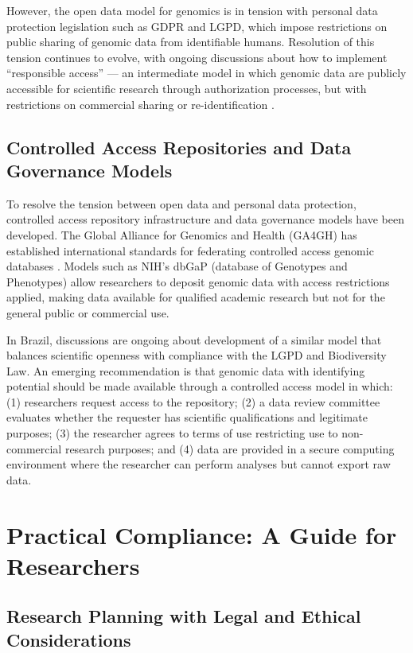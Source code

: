 However, the open data model for genomics is in tension with personal data protection legislation such as GDPR and LGPD, which impose restrictions on public sharing of genomic data from identifiable humans. Resolution of this tension continues to evolve, with ongoing discussions about how to implement ``responsible access'' --- an intermediate model in which genomic data are publicly accessible for scientific research through authorization processes, but with restrictions on commercial sharing or re-identification \parencite{ga4gh2018}.

\subsection{Controlled Access Repositories and Data Governance Models}

To resolve the tension between open data and personal data protection, controlled access repository infrastructure and data governance models have been developed. The Global Alliance for Genomics and Health (GA4GH) has established international standards for federating controlled access genomic databases \parencite{ga4gh2018}. Models such as NIH's dbGaP (database of Genotypes and Phenotypes) allow researchers to deposit genomic data with access restrictions applied, making data available for qualified academic research but not for the general public or commercial use.

In Brazil, discussions are ongoing about development of a similar model that balances scientific openness with compliance with the LGPD and Biodiversity Law. An emerging recommendation is that genomic data with identifying potential should be made available through a controlled access model in which: (1) researchers request access to the repository; (2) a data review committee evaluates whether the requester has scientific qualifications and legitimate purposes; (3) the researcher agrees to terms of use restricting use to non-commercial research purposes; and (4) data are provided in a secure computing environment where the researcher can perform analyses but cannot export raw data.

\section{Practical Compliance: A Guide for Researchers}

\subsection{Research Planning with Legal and Ethical Considerations}

